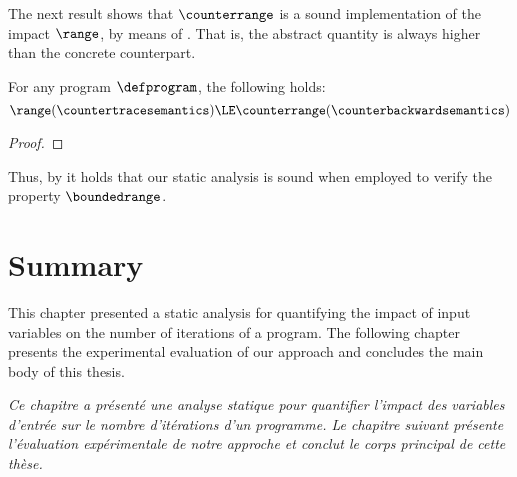 The next result shows that $\counterrange$ is a sound implementation of the impact $\range$, by means of .
That is, the abstract quantity is always higher than the concrete counterpart.
\begin{lemma}
  For any program $\defprogram$,
  the following holds:
  \begin{equation*}
    \range(\countertracesemantics) \LE \counterrange(\counterbackwardsemantics)
  \end{equation*}
\end{lemma}
  \begin{proof}
  \end{proof}
%
Thus, by  it holds that our static analysis is sound when employed to verify the property $\boundedrange$.



\section{Summary}

This chapter presented a static analysis for quantifying the impact of input variables on the number of iterations of a program.
The following chapter presents the experimental evaluation of our approach and concludes the main body of this thesis.

\emph{Ce chapitre a présenté une analyse statique pour quantifier l'impact des variables d'entrée sur le nombre d'itérations d'un programme. Le chapitre suivant présente l'évaluation expérimentale de notre approche et conclut le corps principal de cette thèse.}

